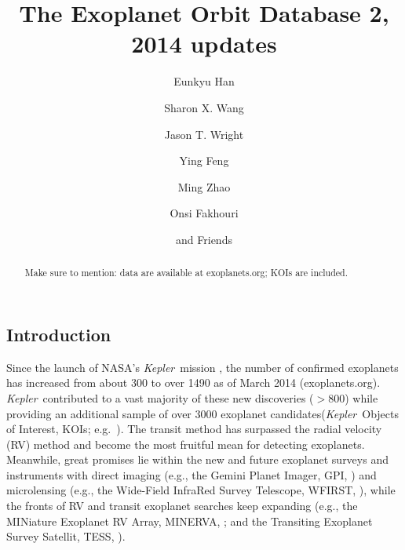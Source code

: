 \documentclass[11pt,preprint]{aastex}
\def\kepler{\textit{Kepler}}
\begin{document}
\begin{CJK*}{UTF8}{gbsn}

\title{The Exoplanet Orbit Database 2, 2014 updates}

\author{Eunkyu Han}
\author{Sharon X. Wang}
\author{Jason T. Wright}
\author{Ying Feng}
\author{Ming Zhao}
\author{Onsi Fakhouri}
\author{and Friends}



\begin{abstract}
Make sure to mention: data are available at exoplanets.org; KOIs are included.
\end{abstract}  

\section{Introduction}\label{sec:intro}

Since the launch of NASA's \kepler\ mission \citep{Borucki2010}, the
number of confirmed exoplanets has increased from about 300 to over
1490 as of March 2014 (exoplanets.org). \kepler\ contributed to a vast
majority of these new discoveries ($> 800$) while providing an
additional sample of over 3000 exoplanet candidates(\kepler\ Objects
of Interest, KOIs; e.g.~\citealt{Batalha2013}). The transit method has
surpassed the radial velocity (RV) method and become the most fruitful
mean for detecting exoplanets. Meanwhile, great promises lie within
the new and future exoplanet surveys and instruments with direct
imaging (e.g., the Gemini Planet Imager, GPI,
\citealt{Macintosh2014}) and microlensing (e.g., the Wide-Field
InfraRed Survey Telescope, WFIRST, \citealt{Green2012}), while the
fronts of RV and transit exoplanet searches keep expanding (e.g., the
MINiature Exoplanet RV Array, MINERVA, \citealt{Wright2014}; and the
Transiting Exoplanet Survey Satellit, TESS, \citealt{Ricker2010}).


\end{CJK*}
\end{document}

